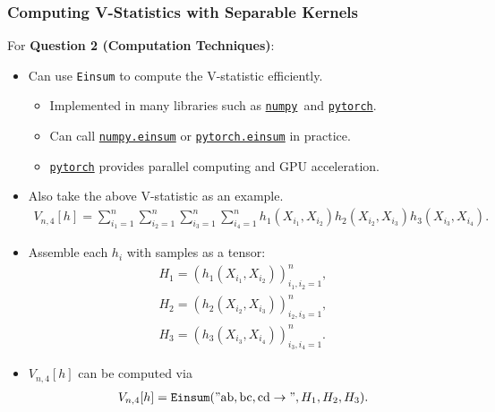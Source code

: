\documentclass[9pt]{beamer}
\theoremstyle{mystyle}
\theoremstyle{mystyletwo}
\newcommand{\libref}[2]{\href{#2}{\texttt{#1}}}
\newcommand{\numpy}{\libref{numpy}{https://numpy.org/}}
\newcommand{\torch}{\libref{pytorch}{https://pytorch.org/}}
\newcommand{\numpyeinsum}{\libref{numpy.einsum}{https://numpy.org/doc/2.1/reference/generated/numpy.einsum.html}}
\newcommand{\torcheinsum}{\libref{pytorch.einsum}{https://pytorch.org/docs/stable/generated/torch.einsum.html}}
\begin{document}
\begin{frame}
    \frametitle{Computing V-Statistics with Separable Kernels}
    For {\bf Question 2 (Computation Techniques)}:
    \begin{itemize}
        \item Can use \texttt{Einsum} to compute the V-statistic efficiently.
              \begin{itemize}
                  \item Implemented in many libraries such as \numpy\ and \torch.
                  \item Can call \numpyeinsum{} or \torcheinsum{} in practice.
                  \item \torch{} provides parallel computing and GPU acceleration.
              \end{itemize}
        \pause
        \item Also take the above V-statistic as an example.
              \begin{align*}
                  V_{n,4}[h] = \sum_{i_1 = 1}^{n} \sum_{i_2 = 1}^{n} \sum_{i_3 = 1}^{n} \sum_{i_4 = 1}^{n} h_1(X_{i_1}, X_{i_2})h_2(X_{i_2}, X_{i_3})h_3(X_{i_3}, X_{i_4}).
              \end{align*}
        \item Assemble each $h_i$ with samples as a tensor:
              \begin{align*}
                  H_1 = \left( h_1(X_{i_1}, X_{i_2}) \right)_{i_1,i_2=1}^{n}, \\
                  H_2 = \left( h_2(X_{i_2}, X_{i_3}) \right)_{i_2,i_3=1}^{n}, \\
                  H_3 = \left( h_3(X_{i_3}, X_{i_4}) \right)_{i_3,i_4=1}^{n}.
              \end{align*}
        \item $V_{n,4}[h]$ can be computed via
              \begin{align*}
                  V_{n,4}[h] = \texttt{Einsum}(\mathrm{"ab,bc,cd\to"}, H_1, H_2, H_3).
              \end{align*}
    \end{itemize}
\end{frame}
\end{document}
